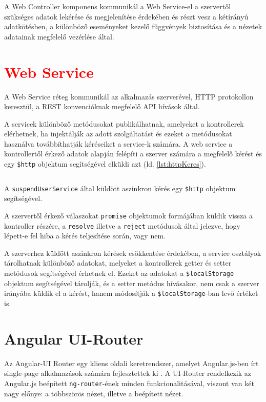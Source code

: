 A Web Controller komponens kommunikál a Web Service-el a szervertől szükséges adatok lekérése és megjelenítése érdekében és részt vesz a kétírányú adatkötésben, a különböző eseményeket kezelő függvények biztosítása és a nézetek adatainak megfelelő vezérlése által. 

\section{\textcolor{red}{Web Service}}
\label{sec:webService}
A Web Service réteg kommunikál az alkalmazás szerverével, HTTP protokollon keresztül, a REST konvencióknak megfelelő API hívások által. 

A servicek különböző metódusokat publikálhatnak, amelyeket a kontrollerek elérhetnek, ha injektálják az adott szolgáltatást és ezeket a metódusokat használva továbbíthatják kéréseiket a service-k számára. A web service a kontrollertől érkező adatok alapján felépíti a szerver számára a megfelelő kérést és egy \texttt{\$http} objektum segítségével elküldi azt (ld. \ref{lst:httpKeres}).

\begin{listing}
  \inputminted[fontsize=\small]{js}{progfiles/httpKeres.js}
  \caption{A \texttt{suspendUserService} által küldött aszinkron kérés egy \texttt{\$http} objektum segítségével.}
  \label{lst:httpKeres}
\end{listing}
A szervertől érkező válaszokat \texttt{promise} objektumok formájában küldik vissza a kontroller részére, a \texttt{resolve} illetve a \texttt{reject} metódusok által jelezve, hogy lépett-e fel hiba a kérés teljesítése során, vagy nem. 

A szerverhez küldött aszinkron kérések csökkentése érdekében, a service osztályok tárolhatnak különböző adatokat, melyeket a kontrollerek getter és setter metódusok segítségével érhetnek el. Ezeket az adatokat a \texttt{\$localStorage} objektum segítségével tárolják, és a setter metódus hívásakor, nem csak a szerver irányába küldik el a kérést, hanem módosítják a \texttt{\$localStorage}-ban levő értéket is. 

\section{Angular UI-Router}
\label{UI-Router}

Az Angular-UI Router egy kliens oldali keretrendszer, amelyet Angular.js-ben írt single-page alkalmazások számára fejlesztettek ki \cite{uirouter}. A UI-Router rendelkezik az Angular.js beépített \texttt{ng-router}-ének minden funkcionalitásával, viszont van két nagy előnye: a többszörös nézet, illetve a beépített nézet. 

